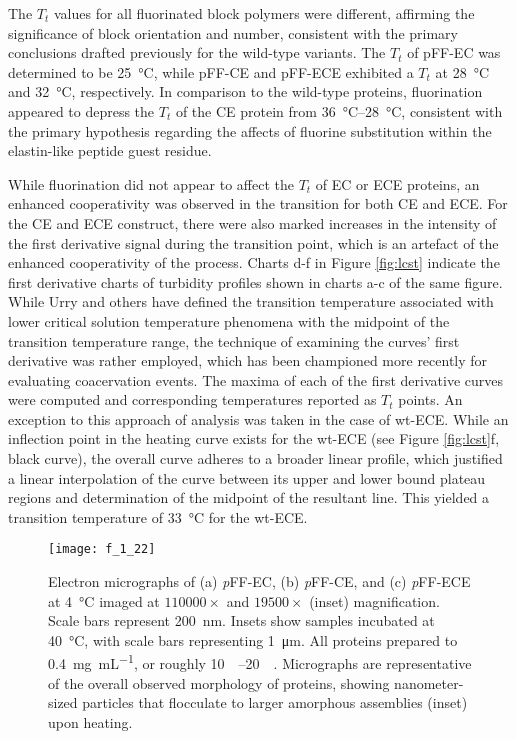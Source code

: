 \begin{refsection}
The ${T_t}$ values for all fluorinated block polymers were different, affirming
the significance of block orientation and number, consistent with the primary
conclusions drafted previously for the wild-type
variants.\cite{Haghpanah2010,Haghpanah2009} The ${T_t}$ of pFF-EC was determined
to be \SI{25}{\celsius}, while pFF-CE and pFF-ECE exhibited a ${T_t}$ at
\SI{28}{\celsius} and \SI{32}{\celsius}, respectively. In comparison to the
wild-type proteins, fluorination appeared to depress the ${T_t}$ of the CE
protein from \SIrange{36}{28}{\celsius}, consistent with the primary hypothesis
regarding the affects of fluorine substitution within the elastin-like peptide
guest residue.

While fluorination did not appear to affect the ${T_t}$ of EC or ECE proteins,
an enhanced cooperativity was observed in the transition for both CE and ECE.
For the CE and ECE construct, there were also marked increases in the intensity
of the first derivative signal during the transition point, which is an artefact
of the enhanced cooperativity of the process.  Charts d-f in Figure
\ref{fig:lcst} indicate the first derivative charts of turbidity profiles shown
in charts a-c of the same figure. While Urry and others have defined the
transition temperature associated with lower critical solution temperature
phenomena with the midpoint of the transition temperature
range,\cite{Urry1993,Nuhn2008} the technique of examining the curves' first
derivative was rather employed, which has been championed more recently for
evaluating coacervation
events.\cite{Furgeson2006,Liu2010b,Mackay2010a,Meyer2004} The maxima of each of
the first derivative curves were computed and corresponding temperatures
reported as ${T_t}$ points.  An exception to this approach of analysis was taken
in the case of wt-ECE. While an inflection point in the heating curve exists for
the wt-ECE (see Figure \ref{fig:lcst}f, black curve), the overall curve adheres
to a broader linear profile, which justified a linear interpolation of the curve
between its upper and lower bound plateau regions and determination of the
midpoint of the resultant line. This yielded a transition temperature of
\SI{33}{\celsius} for the wt-ECE.

\begin{figure}[h!] \centering \texttt{[image: f\_1\_22]}
    \caption{Electron micrographs of (a) \emph{p}FF-EC, (b) \emph{p}FF-CE, and
    (c) \emph{p}FF-ECE at \SI{4}{\celsius} imaged at ${110000 \times}$ and
    ${19500 \times}$ (inset) magnification. Scale bars represent \SI{200}{\nm}.
    Insets show samples incubated at \SI{40}{\celsius}, with scale bars
    representing \SI{1}{\um}. All proteins prepared to \SI{0.4}{\mg\per\mL}, or
    roughly \SIrange{10}{20}{\micro\moLar}. Micrographs are representative of
    the overall observed morphology of proteins, showing nanometer-sized
    particles that flocculate to larger amorphous assemblies (inset) upon heating.}
    \label{fig:block_EM_pFF}
\end{figure}


\end{refsection}
